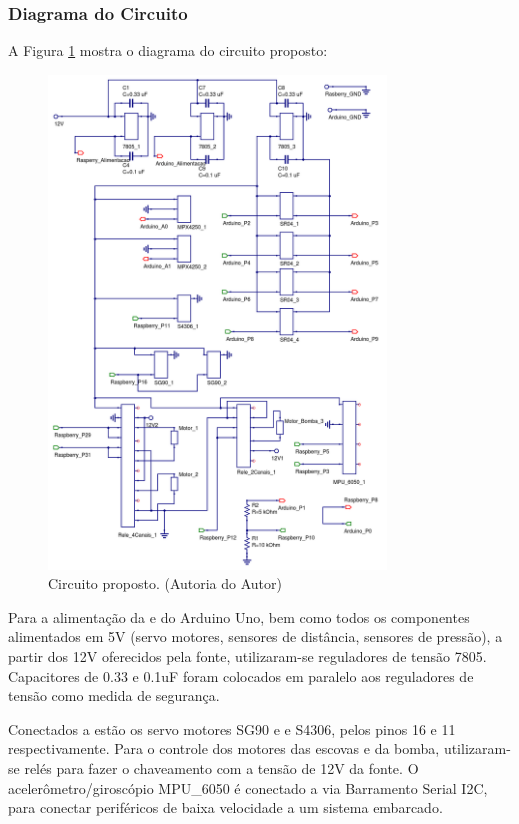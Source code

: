 \subsubsection{Diagrama do Circuito}
A Figura \ref{fig:circuit} mostra o diagrama do circuito proposto:
\par
\begin{figure}[h]
  \centering
  \includegraphics[width=0.8\textwidth]{figures/circuit.png}
  \caption{Circuito proposto. (\textsf{Autoria do Autor)}}
  \label{fig:circuit}
\end{figure}
\FloatBarrier
\par

Para a alimentação da  e do Arduino Uno, bem como todos os componentes alimentados em 5V (servo motores, sensores de distância, sensores de pressão), a partir dos 12V oferecidos pela fonte, utilizaram-se reguladores de tensão 7805. Capacitores de 0.33 e 0.1uF foram colocados em paralelo aos reguladores de tensão como medida de segurança.

Conectados a  estão os servo motores SG90 e e S4306, pelos pinos 16 e 11 respectivamente. Para o controle dos motores das escovas e da bomba, utilizaram-se relés para fazer o chaveamento com a tensão de 12V da fonte. O acelerômetro/giroscópio MPU\_6050 é conectado a \rasp via Barramento Serial I2C, para conectar periféricos de baixa velocidade a um sistema embarcado.

